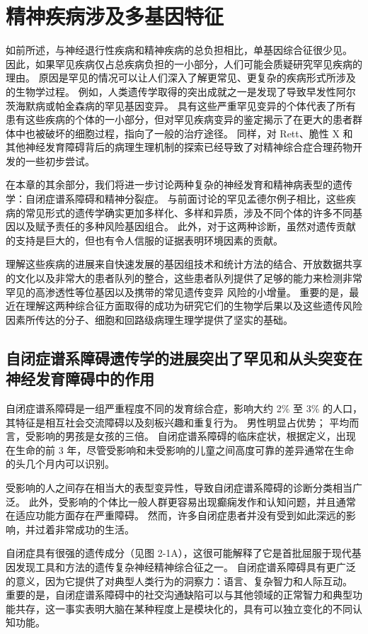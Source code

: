 \section{精神疾病涉及多基因特征}
如前所述，与神经退行性疾病和精神疾病的总负担相比，单基因综合征很少见。 因此，如果罕见疾病仅占总疾病负担的一小部分，人们可能会质疑研究罕见疾病的理由。 原因是罕见的情况可以让人们深入了解更常见、更复杂的疾病形式所涉及的生物学过程。 例如，人类遗传学取得的突出成就之一是发现了导致早发性阿尔茨海默病或帕金森病的罕见基因变异。 具有这些严重罕见变异的个体代表了所有患有这些疾病的个体的一小部分，但对罕见疾病变异的鉴定揭示了在更大的患者群体中也被破坏的细胞过程，指向了一般的治疗途径。 同样，对 Rett、脆性 X 和其他神经发育障碍背后的病理生理机制的探索已经导致了对精神综合症合理药物开发的一些初步尝试。

在本章的其余部分，我们将进一步讨论两种复杂的神经发育和精神病表型的遗传学：自闭症谱系障碍和精神分裂症。 与前面讨论的罕见孟德尔例子相比，这些疾病的常见形式的遗传学确实更加多样化、多样和异质，涉及不同个体的许多不同基因以及赋予责任的多种风险基因组合。 此外，对于这两种诊断，虽然对遗传贡献的支持是巨大的，但也有令人信服的证据表明环境因素的贡献。

理解这些疾病的进展来自快速发展的基因组技术和统计方法的结合、开放数据共享的文化以及非常大的患者队列的整合，这些患者队列提供了足够的能力来检测非常罕见的高渗透性等位基因以及携带的常见遗传变异 风险的小增量。 重要的是，最近在理解这两种综合征方面取得的成功为研究它们的生物学后果以及这些遗传风险因素所传达的分子、细胞和回路级病理生理学提供了坚实的基础。

\subsection{自闭症谱系障碍遗传学的进展突出了罕见和从头突变在神经发育障碍中的作用}
自闭症谱系障碍是一组严重程度不同的发育综合症，影响大约 2\% 至 3\% 的人口，其特征是相互社会交流障碍以及刻板兴趣和重复行为。 男性明显占优势； 平均而言，受影响的男孩是女孩的三倍。 自闭症谱系障碍的临床症状，根据定义，出现在生命的前 3 年，尽管受影响和未受影响的儿童之间高度可靠的差异通常在生命的头几个月内可以识别。

受影响的人之间存在相当大的表型变异性，导致自闭症谱系障碍的诊断分类相当广泛。 此外，受影响的个体比一般人群更容易出现癫痫发作和认知问题，并且通常在适应功能方面存在严重障碍。 然而，许多自闭症患者并没有受到如此深远的影响，并过着非常成功的生活。

自闭症具有很强的遗传成分（见图 2-1A），这很可能解释了它是首批屈服于现代基因发现工具和方法的遗传复杂神经精神综合征之一。 自闭症谱系障碍具有更广泛的意义，因为它提供了对典型人类行为的洞察力：语言、复杂智力和人际互动。 重要的是，自闭症谱系障碍中的社交沟通缺陷可以与其他领域的正常智力和典型功能共存，这一事实表明大脑在某种程度上是模块化的，具有可以独立变化的不同认知功能。

